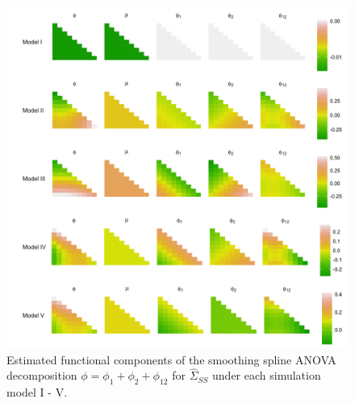 \captionsetup[subfigure]{labelformat=empty}
\begin{figure}[H] \label{fig:ssanova-component-lattice}
\caption{Estimated functional components of the smoothing spline ANOVA decomposition $\phi = \phi_1 + \phi_2 + \phi_{12}$ for $\hat{\Sigma}_{SS}$ under each simulation model I - V.}
  \includegraphics[width = \textwidth]{../img/chapter-4/ssanova-estimate-lattice}
\end{figure}